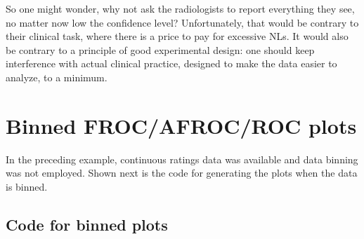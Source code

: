 \documentclass[
]{book}
\begin{document}
So one might wonder, why not ask the radiologists to report everything they see, no matter now low the confidence level? Unfortunately, that would be contrary to their clinical task, where there is a price to pay for excessive NLs. It would also be contrary to a principle of good experimental design: one should keep interference with actual clinical practice, designed to make the data easier to analyze, to a minimum.

\hypertarget{binned-frocafrocroc-plots}{%
\section{Binned FROC/AFROC/ROC plots}\label{binned-frocafrocroc-plots}}

In the preceding example, continuous ratings data was available and data binning was not employed. Shown next is the code for generating the plots when the data is binned.

\hypertarget{binned-plots-code1}{%
\subsection{Code for binned plots}\label{binned-plots-code1}}
\end{document}
